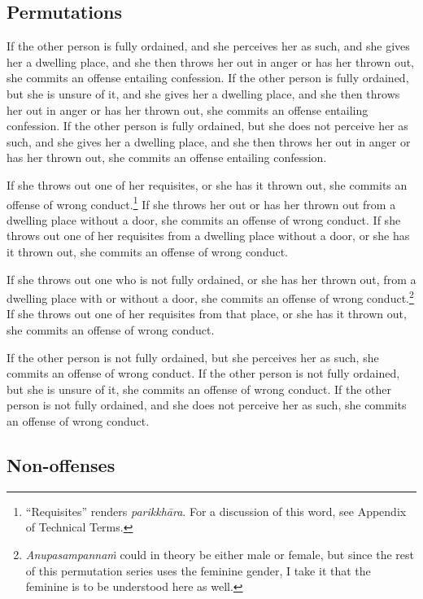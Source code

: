 \documentclass[12pt,openany]{book}%
\begin{document}
\subsection*{Permutations }

If the other person is fully ordained, and she perceives her as such, and she gives her a dwelling place, and she then throws her out in anger or has her thrown out, she commits an offense entailing confession. If the other person is fully ordained, but she is unsure of it, and she gives her a dwelling place, and she then throws her out in anger or has her thrown out, she commits an offense entailing confession. If the other person is fully ordained, but she does not perceive her as such, and she gives her a dwelling place, and she then throws her out in anger or has her thrown out, she commits an offense entailing confession. 

If she throws out one of her requisites, or she has it thrown out, she commits an offense of wrong conduct.\footnote{“Requisites” renders \textit{\textsanskrit{parikkhāra}}. For a discussion of this word, see Appendix of Technical Terms. } If she throws her out or has her thrown out from a dwelling place without a door, she commits an offense of wrong conduct. If she throws out one of her requisites from a dwelling place without a door, or she has it thrown out, she commits an offense of wrong conduct. 

If she throws out one who is not fully ordained, or she has her thrown out, from a dwelling place with or without a door, she commits an offense of wrong conduct.\footnote{\textit{\textsanskrit{Anupasampannaṁ}} could in theory be either male or female, but since the rest of this permutation series uses the feminine gender, I take it that the feminine is to be understood here as well. } If she throws out one of her requisites from that place, or she has it thrown out, she commits an offense of wrong conduct. 

If the other person is not fully ordained, but she perceives her as such, she commits an offense of wrong conduct. If the other person is not fully ordained, but she is unsure of it, she commits an offense of wrong conduct. If the other person is not fully ordained, and she does not perceive her as such, she commits an offense of wrong conduct. 

\subsection*{Non-offenses }
\end{document}
